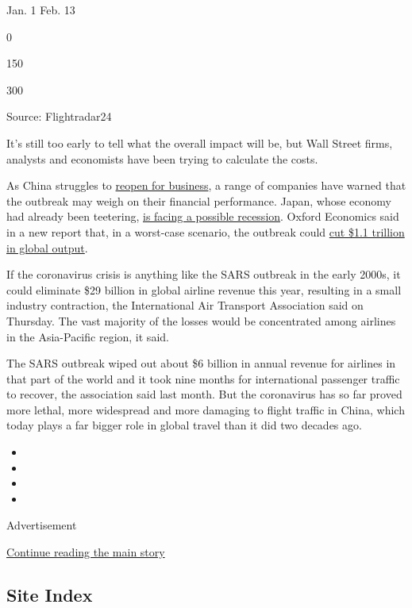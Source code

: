 Jan. 1 Feb. 13

0

150

300

Source: Flightradar24

It's still too early to tell what the overall impact will be, but Wall
Street firms, analysts and economists have been trying to calculate the
costs.

As China struggles to
\href{https://www.nytimes3xbfgragh.onion/2020/02/17/business/china-coronavirus-economy.html}{reopen
for business}, a range of companies have warned that the outbreak may
weigh on their financial performance. Japan, whose economy had already
been teetering,
\href{https://www.nytimes3xbfgragh.onion/2020/02/16/business/coronavirus-japan-economy.html}{is
facing a possible recession}. Oxford Economics said in a new report
that, in a worst-case scenario, the outbreak could
\href{https://twitter.com/OxfordEconomics/status/1230208948395008001}{cut
\$1.1 trillion in global output}.

If the coronavirus crisis is anything like the SARS outbreak in the
early 2000s, it could eliminate \$29 billion in global airline revenue
this year, resulting in a small industry contraction, the International
Air Transport Association said on Thursday. The vast majority of the
losses would be concentrated among airlines in the Asia-Pacific region,
it said.

The SARS outbreak wiped out about \$6 billion in annual revenue for
airlines in that part of the world and it took nine months for
international passenger traffic to recover, the association said last
month. But the coronavirus has so far proved more lethal, more
widespread and more damaging to flight traffic in China, which today
plays a far bigger role in global travel than it did two decades ago.

\begin{itemize}
\item
\item
\item
\item
\end{itemize}

Advertisement

\protect\hyperlink{after-bottom}{Continue reading the main story}

\hypertarget{site-index}{%
\subsection{Site Index}\label{site-index}}

